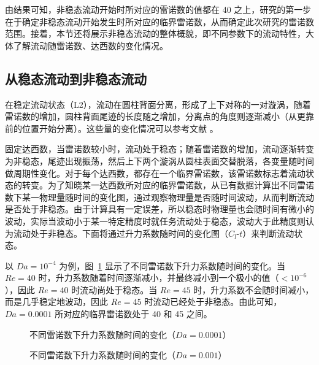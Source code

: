 由结果可知，非稳态流动开始时所对应的雷诺数的值都在 40 之上，研究的第一步在于确定非稳态流动开始发生时所对应的临界雷诺数，从而确定此次研究的雷诺数范围。接着，本节还将展示非稳态流动的整体概貌，即不同参数下的流动特性，大体了解流动随雷诺数、达西数的变化情况。

\subsection{从稳态流动到非稳态流动}

在稳定流动状态（L2），流动在圆柱背面分离，形成了上下对称的一对漩涡，随着雷诺数的增加，圆柱背面尾迹的长度随之增加，分离点的角度则逐渐减小（从更靠前的位置开始分离）。这些量的变化情况可以参考文献 \cite{}。

固定达西数，当雷诺数较小时，流动处于稳态；随着雷诺数的增加，流动逐渐转变为非稳态，尾迹出现振荡，然后上下两个漩涡从圆柱表面交替脱落，各变量随时间做周期性变化。对于每个达西数，都存在一个临界雷诺数，该雷诺数标志着流动状态的转变。为了知晓某一达西数所对应的临界雷诺数，从已有数据计算出不同雷诺数下某一物理量随时间的变化图，通过观察物理量是否随时间波动，从而判断流动是否处于非稳态。由于计算具有一定误差，所以稳态时物理量也会随时间有微小的波动，实际当波动小于某一特定精度时就任务流动处于稳态，波动大于此精度则认为流动处于非稳态。下面将通过升力系数随时间的变化图（$C_{\mathrm{l}}$-$t$）来判断流动状态。

以 $Da=10^{-4}$ 为例，图~\ref{fig: Cl_t-1e-4} 显示了不同雷诺数下升力系数随时间的变化。当 $Re=40$ 时，升力系数随着时间逐渐减小，并最终减小到一个极小的值（$<10^{-6}$），因此 $Re=40$ 时流动尚处于稳态。当 $Re=45$ 时，升力系数不会随时间减小，而是几乎稳定地波动，因此 $Re=45$ 时流动已经处于非稳态。由此可知，$Da=0.0001$ 所对应的临界雷诺数处于 40 和 45 之间。

\begin{figure}
	\setlength{\subfigcapskip}{-1bp}
	\centering
	\begin{minipage}{\textwidth}
		\centering
	\end{minipage}
	\vspace{0.2em}
	\caption{不同雷诺数下升力系数随时间的变化（$Da=0.0001$）}
	\label{fig: Cl_t-1e-4}
\end{figure}

\begin{figure}
	\setlength{\subfigcapskip}{-1bp}
	\centering
	\begin{minipage}{\textwidth}
		\centering
	\end{minipage}
	\vspace{0.2em}
	\caption{不同雷诺数下升力系数随时间的变化（$Da=0.001$）}
	\label{fig: Cl_t-1e-3}
\end{figure}

